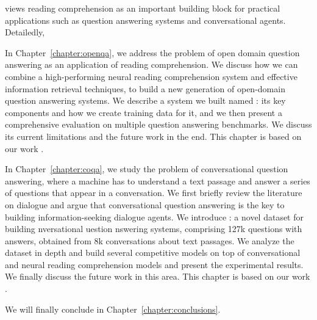  views reading comprehension as an important building block for practical applications such as question answering systems and conversational agents. Detailedly,
\begin{description}
    \item In Chapter~\ref{chapter:openqa}, we address the problem of open domain question answering as an application of reading comprehension. We discuss how we can combine a high-performing neural reading comprehension system and effective information retrieval techniques, to build a new generation of open-domain question answering systems. We describe a system we built named : its key components and how we create training data for it, and we then present a comprehensive evaluation on multiple question answering benchmarks. We discuss its current limitations and the future work in the end. This chapter is based on our work \cite{chen2017reading}.
    \item In Chapter~\ref{chapter:coqa}, we study the problem of conversational question answering, where a machine has to understand a text passage and answer a series of questions that appear in a conversation. We first briefly review the literature on dialogue and argue that conversational question answering is the key to building information-seeking dialogue agents. We introduce : a novel dataset for building nversational uestion nswering systems, comprising 127k questions with answers, obtained from 8k conversations about text passages. We analyze the dataset in depth and build several competitive models on top of conversational and neural reading comprehension models and present the experimental results. We finally discuss the future work in this area. This chapter is based on our work \cite{reddy2019coqa}.
\end{description}
We will finally conclude in Chapter~\ref{chapter:conclusions}.

